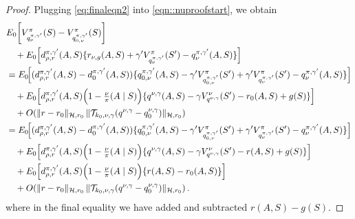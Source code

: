 \documentclass[11pt]{article}
\theoremstyle{plain}
\begin{document}
\begin{proof}
Plugging \eqref{eq:finaleqn2} into \eqref{eqn::nuproofstart}, we obtain
\begin{align}
& E_0\!\left[V_{q_{\nu}^{\pi,\gamma'}}^\pi(S) - V_{q_{0,\nu}^{\pi,\gamma'}}^\pi(S)\right] \notag\\
&\quad + E_0\!\left[d_{\rho,r}^{\pi,\gamma'}(A,S)\{r_{\nu,g}(A,S) + \gamma' V_{q_{\nu}^{\pi,\gamma'}}^\pi(S') - q_{\nu}^{\pi,\gamma'}(A,S)\}\right]  \notag \\
&= E_0\!\Big[(d_{\rho,r}^{\pi,\gamma'}(A,S) - d_0^{\pi,\gamma'}(A,S))\{q_{0,\nu}^{\pi,\gamma'}(A,S) - \gamma' V_{q_{0,\nu}^{\pi,\gamma'}}^\pi(S') + \gamma' V_{q_{\nu}^{\pi,\gamma'}}^\pi(S') - q_{\nu}^{\pi,\gamma'}(A,S)\}\Big]    \notag \\
&\quad + E_0\!\left[d_{\rho,r}^{\pi,\gamma'}(A,S)\Bigl(1 - \tfrac{\nu}{\pi}(A \mid S)\Bigr)\{q^{\nu,\gamma}(A,S) - \gamma V_{q^{\nu,\gamma}}^{\nu}(S') - r_0(A,S) + g(S)\}\right] \notag \\
&\quad + O\!\left(\|r - r_0\|_{\mathcal{H},r_0}\,\|\mathcal{T}_{k_0,\nu,\gamma}(q^{\nu,\gamma} - q_0^{\nu,\gamma})\|_{\mathcal{H},r_0}\right) \notag \\
&= E_0\!\Big[(d_{\rho,r}^{\pi,\gamma'}(A,S) - d_0^{\pi,\gamma'}(A,S))\{q_{0,\nu}^{\pi,\gamma'}(A,S) - \gamma' V_{q_{0,\nu}^{\pi,\gamma'}}^\pi(S') + \gamma' V_{q_{\nu}^{\pi,\gamma'}}^\pi(S') - q_{\nu}^{\pi,\gamma'}(A,S)\}\Big]    \notag \\
&\quad + E_0\!\left[d_{\rho,r}^{\pi,\gamma'}(A,S)\Bigl(1 - \tfrac{\nu}{\pi}(A \mid S)\Bigr)\{q^{\nu,\gamma}(A,S) - \gamma V_{q^{\nu,\gamma}}^{\nu}(S') - r(A,S) + g(S)\}\right] \notag \\
&\quad + E_0\!\left[d_{\rho,r}^{\pi,\gamma'}(A,S)\Bigl(1 - \tfrac{\nu}{\pi}(A \mid S)\Bigr)\{r(A,S) - r_0(A,S)\}\right] \notag \\
&\quad + O\!\left(\|r - r_0\|_{\mathcal{H},r_0}\,\|\mathcal{T}_{k_0,\nu,\gamma}(q^{\nu,\gamma} - q_0^{\nu,\gamma})\|_{\mathcal{H},r_0}\right).
\label{eq:main_expansionnu}
\end{align}
where in the final equality we have added and subtracted \(r(A,S)-g(S)\).



\end{proof}
\end{document}
